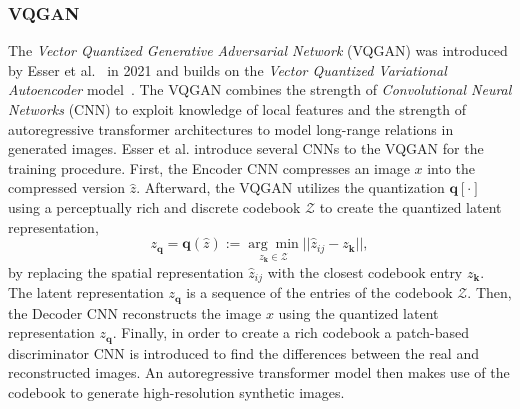 \subsubsection{VQGAN}
\label{sec:wuerstchen:VQGAN}
The \emph{Vector Quantized Generative Adversarial Network} (VQGAN) was
introduced by Esser et al.~\cite{esser2021tamingtransformershighresolutionimage}
in 2021 and builds on the \emph{Vector Quantized Variational Autoencoder}
model~\cite{vdOord2017NeuralDiscreteRepresentationLearning}. The VQGAN combines
the strength of \emph{Convolutional Neural Networks} (CNN) to exploit knowledge
of local features and the strength of autoregressive transformer architectures
to model long-range relations in generated images. Esser et al. introduce
several CNNs to the VQGAN for the training procedure. First, the Encoder CNN
compresses an image $x$ into the compressed version $\hat{z}$. Afterward,
the VQGAN utilizes the quantization $\boldsymbol{q}[\cdot]$ using a
perceptually rich and discrete codebook $\mathcal{Z}$ to create the quantized
latent representation,
\begin{equation}
    z_{\boldsymbol{q}} = \boldsymbol{q}(\hat{z}) :=\underset{z_{\boldsymbol{k}}\in\mathcal{Z}}{\arg\min}||\hat{z}_{ij} - z_{\boldsymbol{k}}||,
\end{equation}
by replacing the spatial representation $\hat{z}_{ij}$ with the closest
codebook entry $z_{\boldsymbol{k}}$. The latent representation
$z_{\boldsymbol{q}}$ is a sequence of the entries of the codebook $\mathcal{Z}$.
Then, the Decoder CNN reconstructs the image $x$ using the quantized latent
representation $z_{\boldsymbol{q}}$. Finally, in order to create a rich codebook
a patch-based discriminator CNN is introduced to find the differences between
the real and reconstructed images. An autoregressive transformer model then
makes use of the codebook to generate high-resolution synthetic images.

